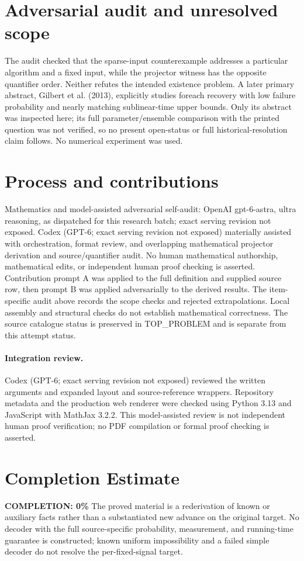 \documentclass[11pt]{article}
\begin{document}
\section{Adversarial audit and unresolved scope}
The audit checked that the sparse-input counterexample addresses a particular
algorithm and a fixed input, while the projector witness has the opposite
quantifier order. Neither refutes the intended existence problem. A later
primary abstract, Gilbert et al. (2013), explicitly studies foreach recovery
with low failure probability and nearly matching sublinear-time upper bounds.
Only its abstract was inspected here; its full parameter/ensemble comparison
with the printed question was not verified, so no present open-status or
full historical-resolution claim follows. No numerical experiment was used.

\section{Process and contributions}
Mathematics and model-assisted adversarial self-audit: OpenAI gpt-6-astra, ultra reasoning, as dispatched for this research batch; exact serving revision not exposed. Codex (GPT-6; exact serving revision not exposed) materially assisted with orchestration, format review, and overlapping mathematical projector derivation and source/quantifier audit. No human mathematical authorship, mathematical edits, or independent human proof checking is asserted.
Contribution prompt A was applied to the full definition and supplied source row, then prompt B was applied adversarially to the derived results. The item-specific audit above records the scope checks and rejected extrapolations. Local assembly and structural checks do not establish mathematical correctness. The source catalogue status is preserved in TOP\_PROBLEM and is separate from this attempt status.
\paragraph{Integration review.} Codex (GPT-6; exact serving revision not exposed) reviewed the written arguments and expanded layout and source-reference wrappers. Repository metadata and the production web renderer were checked using Python 3.13 and JavaScript with MathJax 3.2.2. This model-assisted review is not independent human proof verification; no PDF compilation or formal proof checking is asserted.

\section{Completion Estimate}
\noindent\textbf{COMPLETION: 0\%}
The proved material is a rederivation of known or auxiliary facts rather than a substantiated new advance on the original target. No decoder with the full source-specific probability, measurement, and running-time guarantee is constructed; known uniform impossibility and a failed simple decoder do not resolve the per-fixed-signal target.
\end{document}
